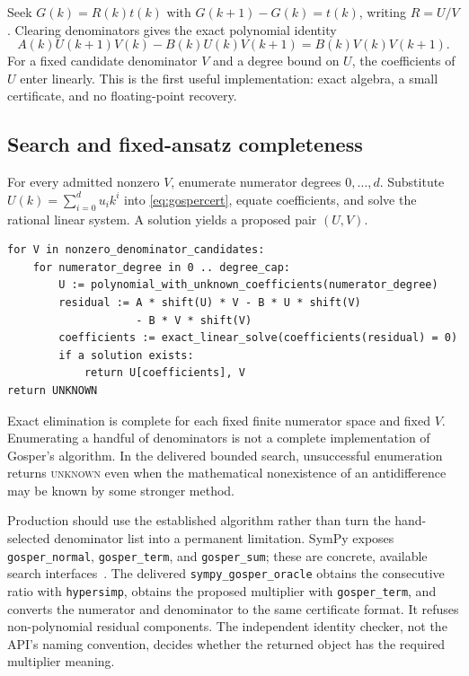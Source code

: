 \documentclass[11pt,letterpaper]{article}
\newcommand{\code}[1]{\texttt{#1}}
\newcommand{\unknown}{\textsc{unknown}}
\theoremstyle{definition}\newtheorem{definition}[theorem]{Definition}
\theoremstyle{remark}\newtheorem{remark}[theorem]{Remark}
\begin{document}
Seek $G(k)=R(k)t(k)$ with $G(k+1)-G(k)=t(k)$, writing $R=U/V$.
Clearing denominators gives the exact polynomial identity
\begin{equation}
 A(k)U(k+1)V(k)-B(k)U(k)V(k+1)
   =B(k)V(k)V(k+1).
 \label{eq:gospercert}
\end{equation}
For a fixed candidate denominator $V$ and a degree bound on $U$, the coefficients
of $U$ enter linearly. This is the first useful implementation: exact algebra,
a small certificate, and no floating-point recovery.

\subsection{Search and fixed-ansatz completeness}
For every admitted nonzero $V$, enumerate numerator degrees $0,\ldots,d$.
Substitute $U(k)=\sum_{i=0}^{d}u_i k^i$ into
\eqref{eq:gospercert}, equate coefficients, and solve the rational linear
system. A solution yields a proposed pair $(U,V)$.

\par\noindent\begin{minipage}{\linewidth}
\begin{lstlisting}
for V in nonzero_denominator_candidates:
    for numerator_degree in 0 .. degree_cap:
        U := polynomial_with_unknown_coefficients(numerator_degree)
        residual := A * shift(U) * V - B * U * shift(V)
                    - B * V * shift(V)
        coefficients := exact_linear_solve(coefficients(residual) = 0)
        if a solution exists:
            return U[coefficients], V
return UNKNOWN
\end{lstlisting}
\end{minipage}\par\smallskip

Exact elimination is complete for each fixed finite numerator space and fixed
$V$. Enumerating a handful of denominators is not a complete implementation of
Gosper's algorithm. In the delivered bounded search, unsuccessful enumeration
returns \unknown{} even when the mathematical nonexistence of an
antidifference may be known by some stronger method.

Production should use the established algorithm rather than turn the
hand-selected denominator list into a permanent limitation. SymPy exposes
\code{gosper\_normal}, \code{gosper\_term}, and \code{gosper\_sum}; these are
concrete, available search interfaces~\cite{sympy-concrete}. The delivered
\code{sympy\_gosper\_oracle} obtains the consecutive ratio with
\code{hypersimp}, obtains the proposed multiplier with
\code{gosper\_term}, and converts the numerator and denominator to the same
certificate format. It refuses non-polynomial residual components. The
independent identity checker, not the API's naming convention, decides whether
the returned object has the required multiplier meaning.
\end{document}
